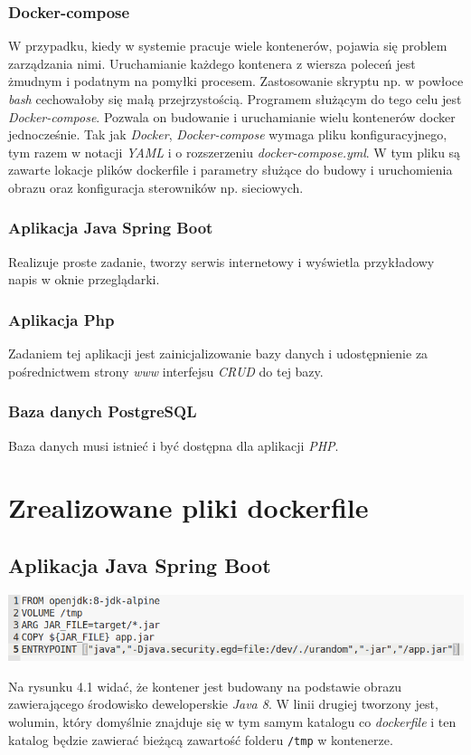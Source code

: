 \documentclass[polish, a4paper, 12pt, oneside]{book}
\begin{document}
	\subsubsection{Docker-compose}
	W przypadku, kiedy w systemie pracuje wiele kontenerów, pojawia się problem zarządzania nimi. Uruchamianie każdego kontenera z wiersza poleceń jest żmudnym i podatnym na pomyłki procesem. Zastosowanie skryptu np. w powłoce \textit{bash} cechowałoby się małą przejrzystością. Programem służącym do tego celu jest \textit{Docker-compose}. Pozwala on budowanie i uruchamianie wielu kontenerów docker jednocześnie. Tak jak \textit{Docker}\cite{docker}, \textit{Docker-compose}\cite{dockercompose} wymaga pliku konfiguracyjnego, tym razem w notacji \textit{YAML} i o rozszerzeniu \textit{docker-compose.yml}. W tym pliku są zawarte lokacje plików dockerfile i parametry służące do budowy i uruchomienia obrazu oraz konfiguracja sterowników np. sieciowych.
	\subsubsection{Aplikacja Java Spring Boot}
	Realizuje proste zadanie, tworzy serwis internetowy i wyświetla przykładowy napis w oknie przeglądarki.
	\subsubsection{Aplikacja Php}
	Zadaniem tej aplikacji jest zainicjalizowanie bazy danych i udostępnienie za pośrednictwem strony \textit{www} interfejsu \textit{CRUD} do tej bazy.
	\subsubsection{Baza danych PostgreSQL}
	Baza danych musi istnieć i być dostępna dla aplikacji \textit{PHP}.
	\section{Zrealizowane pliki dockerfile}
	\subsection{Aplikacja Java Spring Boot}
	\begin{center}
		\includegraphics[width=160mm]{dockerfile_java.png}
	\end{center}
	Na rysunku 4.1 widać, że kontener jest budowany na podstawie obrazu zawierającego środowisko deweloperskie \textit{Java 8}\cite{java}. W linii drugiej tworzony jest, wolumin, który domyślnie znajduje się w tym samym katalogu co \textit{dockerfile} i ten katalog będzie zawierać bieżącą zawartość folderu \texttt{/tmp} w kontenerze.
	
\end{document}
